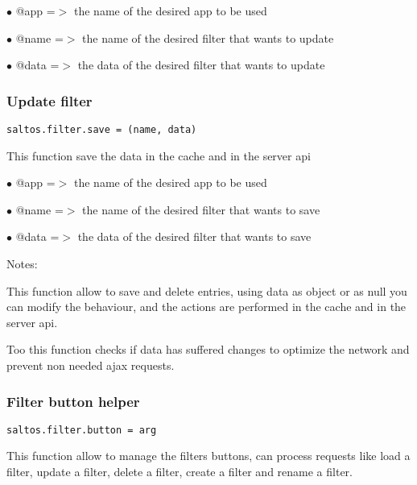 \documentclass[a4paper]{article}
\begin{document}
\begin{compactitem}
\item[\color{myblue}$\bullet$] @app  =$>$ the name of the desired app to be used
\item[\color{myblue}$\bullet$] @name =$>$ the name of the desired filter that wants to update
\item[\color{myblue}$\bullet$] @data =$>$ the data of the desired filter that wants to update
\end{compactitem}

\hypertarget{toc770}{}
\subsubsection{Update filter}

\begin{lstlisting}
saltos.filter.save = (name, data)
\end{lstlisting}

This function save the data in the cache and in the server api

\begin{compactitem}
\item[\color{myblue}$\bullet$] @app  =$>$ the name of the desired app to be used
\item[\color{myblue}$\bullet$] @name =$>$ the name of the desired filter that wants to save
\item[\color{myblue}$\bullet$] @data =$>$ the data of the desired filter that wants to save
\end{compactitem}

Notes:

This function allow to save and delete entries, using data as object or as null
you can modify the behaviour, and the actions are performed in the cache and
in the server api.

Too this function checks if data has suffered changes to optimize the network
and prevent non needed ajax requests.

\hypertarget{toc771}{}
\subsubsection{Filter button helper}

\begin{lstlisting}
saltos.filter.button = arg
\end{lstlisting}

This function allow to manage the filters buttons, can process requests
like load a filter, update a filter, delete a filter, create a filter and
rename a filter.
\end{document}
